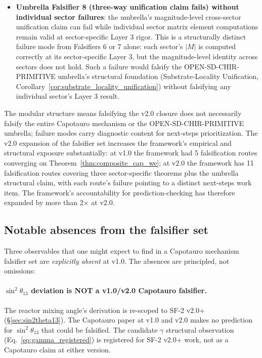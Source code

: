 \documentclass[11pt,letterpaper]{article}
\begin{document}
\begin{itemize}
    \item \textbf{Umbrella Falsifier 8 (three-way unification claim fails) without individual sector failures}: the umbrella's magnitude-level cross-sector unification claim can fail while individual sector matrix element computations remain valid at sector-specific Layer 3 rigor. This is a structurally distinct failure mode from Falsifiers 6 or 7 alone: each sector's $|M|$ is computed correctly at its sector-specific Layer 3, but the magnitude-level identity across sectors does not hold. Such a failure would falsify the OPEN-SD-CHIR-PRIMITIVE umbrella's structural foundation (Substrate-Locality Unification, Corollary~\ref{cor:substrate_locality_unification}) without falsifying any individual sector's Layer 3 result.
\end{itemize}

The modular structure means falsifying the v2.0 closure does not necessarily falsify the entire Capotauro mechanism or the OPEN-SD-CHIR-PRIMITIVE umbrella; failure modes carry diagnostic content for next-steps prioritization. The v2.0 expansion of the falsifier set increases the framework's empirical and structural exposure substantially: at v1.0 the framework had 5 falsification routes converging on Theorem~\ref{thm:composite_cap_we}; at v2.0 the framework has 11 falsification routes covering three sector-specific theorems plus the umbrella structural claim, with each route's failure pointing to a distinct next-steps work item. The framework's accountability for prediction-checking has therefore expanded by more than 2$\times$ at v2.0.

\subsection{Notable absences from the falsifier set}\label{sec:falsifier_absences}

Three observables that one might expect to find in a Capotauro mechanism falsifier set are \emph{explicitly absent} at v1.0. The absences are principled, not omissions:

\paragraph{$\sin^2\theta_{13}$ deviation is NOT a v1.0/v2.0 Capotauro falsifier.}
The reactor mixing angle's derivation is re-scoped to SF-2 v2.0+ (\S\ref{sec:sin2theta13}). The Capotauro paper at v1.0 and v2.0 makes no prediction for $\sin^2\theta_{13}$ that could be falsified. The candidate $\gamma$ structural observation (Eq.~\eqref{eq:gamma_registered}) is registered for SF-2 v2.0+ work, not as a Capotauro claim at either version.
\end{document}
